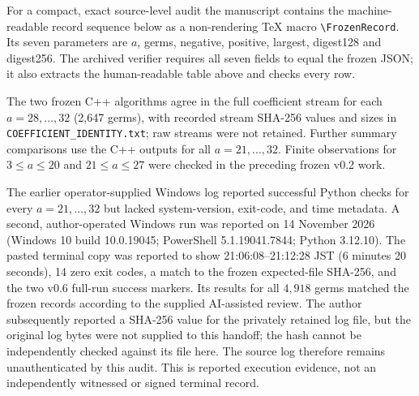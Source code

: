 \documentclass[11pt,a4paper]{article}
\begin{document}
For a compact, exact source-level audit the manuscript contains the machine-readable record sequence below as a non-rendering TeX macro \texttt{\textbackslash FrozenRecord}. Its seven parameters are $a$, germs, negative, positive, largest, digest128 and digest256. The archived verifier requires all seven fields to equal the frozen JSON; it also extracts the human-readable table above and checks every row.
\newcommand{\FrozenRecord}[7]{}
\FrozenRecord{21}{229}{0}{301345}{1424539810121261681492}{9b6746826fbb83aa}{24a67f7210b80b7a}
\FrozenRecord{22}{201}{0}{307257}{78962368881143719986964}{b3fba066beb8a11b}{90ace365b0fec04b}
\FrozenRecord{23}{463}{0}{810365}{1853826076638404528257859}{ac56ca19cc64ee50}{5f0b683542f160b8}
\FrozenRecord{24}{177}{0}{357204}{194104800477684464515092278}{5c9387c2b0eb4d15}{f1a1ab52e1468c9d}
\FrozenRecord{25}{461}{0}{1050577}{5064090658218013612524933603}{557187a28d0c246e}{64f6d154a4c6b76e}
\FrozenRecord{26}{289}{0}{747347}{523370326431276698509288306253}{b16303f86f535a4f}{8561136000124bff}
\FrozenRecord{27}{451}{0}{1309877}{15894911284141789253917681090765}{70fccb20312243f3}{0bcb53ac8cb26a0b}
\FrozenRecord{28}{313}{0}{1021142}{1880959019100822429030604806692217}{86eca0d839f18bc9}{8b8997cb939f1941}
\FrozenRecord{29}{757}{0}{2745865}{56788297270470025326143881220826895}{abf97163166508cf}{9bf13e78f6b35f67}
\FrozenRecord{30}{225}{0}{913489}{11645676464235902389652892794256499070}{a54bceb4027165b3}{7bfcf22b924b5883}
\FrozenRecord{31}{871}{0}{3890157}{253083559911939647497193602142101279586}{9d024440411e3c9f}{98494a7b0c7c0497}
\FrozenRecord{32}{481}{0}{2376488}{18767193023758617887573106305082574283367}{de0176e6073d74a9}{d2100d5ff90cbbb1}

The two frozen C++ algorithms agree in the full coefficient stream for each $a=28,\ldots,32$ (2,647 germs), with recorded stream SHA-256 values and sizes in \nolinkurl{COEFFICIENT_IDENTITY.txt}; raw streams were not retained. Further summary comparisons use the C++ outputs for all $a=21,\ldots,32$. Finite observations for $3\le a\le20$ and $21\le a\le27$ were checked in the preceding frozen v0.2 work.

The earlier operator-supplied Windows log reported successful Python checks for every $a=21,\ldots,32$ but lacked system-version, exit-code, and time metadata. A second, author-operated Windows run was reported on 14 November 2026 (Windows 10 build 10.0.19045; PowerShell 5.1.19041.7844; Python 3.12.10). The pasted terminal copy was reported to show 21:06:08--21:12:28 JST (6 minutes 20 seconds), 14 zero exit codes, a match to the frozen expected-file SHA-256, and the two v0.6 full-run success markers. Its results for all $4{,}918$ germs matched the frozen records according to the supplied AI-assisted review. The author subsequently reported a SHA-256 value for the privately retained log file, but the original log bytes were not supplied to this handoff; the hash cannot be independently checked against its file here. The source log therefore remains unauthenticated by this audit. This is reported execution evidence, not an independently witnessed or signed terminal record.
\end{document}
